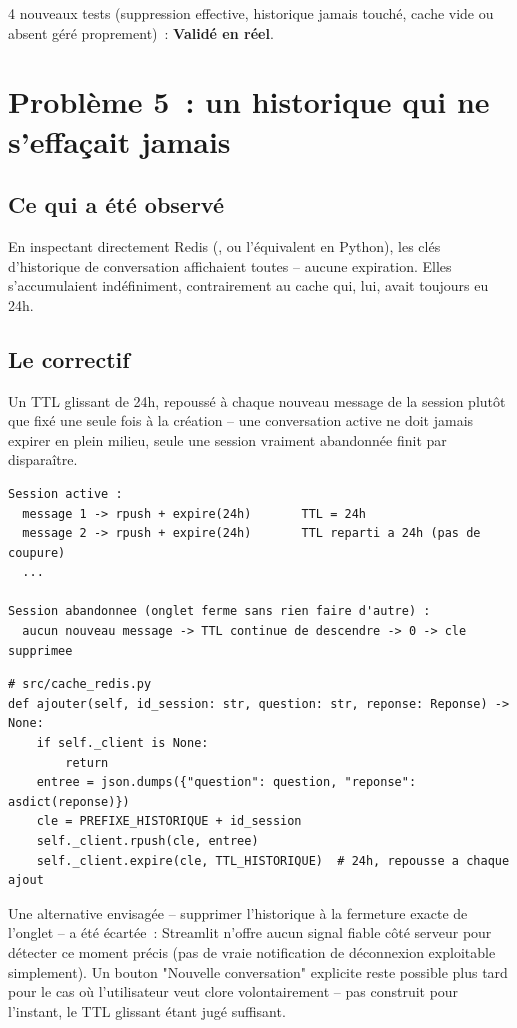 \documentclass[11pt,a4paper]{article}
\newcommand{\code}[1]{\texttt{\detokenize{#1}}}
\newcommand{\ok}{\textcolor{okgreen}{\textbf{Valid\'e en r\'eel}}}
\begin{document}
4 nouveaux tests (suppression effective, historique jamais touch\'e, cache vide ou
absent g\'er\'e proprement)~: \ok{}.

\section{Probl\`eme 5~: un historique qui ne s'effa\c{c}ait jamais}

\subsection{Ce qui a \'et\'e observ\'e}

En inspectant directement Redis (\code{redis-cli}, ou l'\'equivalent en Python), les
cl\'es d'historique de conversation affichaient toutes \code{TTL: -1} -- aucune
expiration. Elles s'accumulaient ind\'efiniment, contrairement au cache qui, lui, avait
toujours eu 24h.

\subsection{Le correctif}

Un TTL glissant de 24h, repouss\'e \`a chaque nouveau message de la session plut\^ot que
fix\'e une seule fois \`a la cr\'eation -- une conversation active ne doit jamais
expirer en plein milieu, seule une session vraiment abandonn\'ee finit par dispara\^itre.

\begin{lstlisting}[style=diagstyle]
Session active :
  message 1 -> rpush + expire(24h)       TTL = 24h
  message 2 -> rpush + expire(24h)       TTL reparti a 24h (pas de coupure)
  ...

Session abandonnee (onglet ferme sans rien faire d'autre) :
  aucun nouveau message -> TTL continue de descendre -> 0 -> cle supprimee
\end{lstlisting}

\begin{lstlisting}
# src/cache_redis.py
def ajouter(self, id_session: str, question: str, reponse: Reponse) -> None:
    if self._client is None:
        return
    entree = json.dumps({"question": question, "reponse": asdict(reponse)})
    cle = PREFIXE_HISTORIQUE + id_session
    self._client.rpush(cle, entree)
    self._client.expire(cle, TTL_HISTORIQUE)  # 24h, repousse a chaque ajout
\end{lstlisting}

Une alternative envisag\'ee -- supprimer l'historique \`a la fermeture exacte de
l'onglet -- a \'et\'e \'ecart\'ee~: Streamlit n'offre aucun signal fiable c\^ot\'e serveur
pour d\'etecter ce moment pr\'ecis (pas de vraie notification de d\'econnexion
exploitable simplement). Un bouton "Nouvelle conversation" explicite reste possible
plus tard pour le cas o\`u l'utilisateur veut clore volontairement -- pas construit
pour l'instant, le TTL glissant \'etant jug\'e suffisant.
\end{document}

